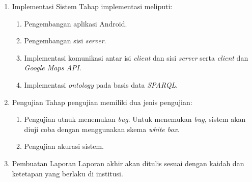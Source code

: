 \begin{enumerate}
\item Implementasi Sistem
\newline
Tahap implementasi meliputi:
\begin{enumerate}
	\item Pengembangan aplikasi Android.
	\item Pengembangan sisi \textit{server}.
	\item Implementasi komunikasi antar isi \textit{client} dan sisi \textit{server} serta \textit{client} dan \textit{Google Maps API}.
	\item Implementasi \textit{ontology} pada basis data \textit{SPARQL}.
\end{enumerate}
 
\item Pengujian
\newline
Tahap pengujian memiliki dua jenis pengujian:
\begin{enumerate}
	\item Pengujian utnuk menemukan \textit{bug}. Untuk menemukan \textit{bug}, sistem akan diuji coba dengan menggunakan skema \textit{white box}.
	\item Pengujian akurasi sistem. 
\end{enumerate}

\item Pembuatan Laporan
\newline 
Laporan akhir akan ditulis sesuai dengan kaidah dan ketetapan yang berlaku di institusi.
\end{enumerate}

